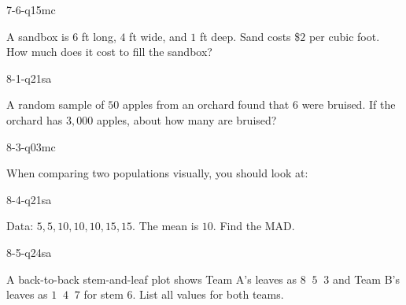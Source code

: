 \begin{practiceQuestion}{7-6-q15}{mc}
\begin{questionText}
A sandbox is $6$ ft long, $4$ ft wide, and $1$ ft deep. Sand costs \$$2$ per cubic foot. How much does it cost to fill the sandbox?
\end{questionText}
\end{practiceQuestion}

\begin{practiceQuestion}{8-1-q21}{sa}
\begin{questionText}
A random sample of $50$ apples from an orchard found that $6$ were bruised. If the orchard has $3{,}000$ apples, about how many are bruised?
\end{questionText}
\end{practiceQuestion}

\begin{practiceQuestion}{8-3-q03}{mc}
\begin{questionText}
When comparing two populations visually, you should look at:
\end{questionText}
\end{practiceQuestion}

\begin{practiceQuestion}{8-4-q21}{sa}
\begin{questionText}
Data: $5, 5, 10, 10, 10, 15, 15$. The mean is $10$. Find the MAD.
\end{questionText}
\end{practiceQuestion}

\begin{practiceQuestion}{8-5-q24}{sa}
\begin{questionText}
A back-to-back stem-and-leaf plot shows Team A's leaves as $8\;\;5\;\;3$ and Team B's leaves as $1\;\;4\;\;7$ for stem $6$. List all values for both teams.
\end{questionText}
\end{practiceQuestion}

